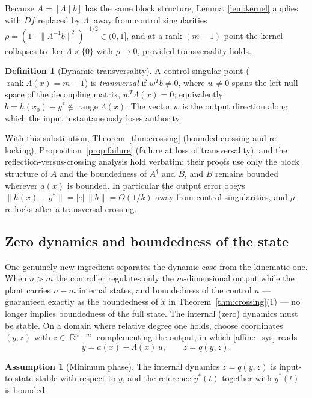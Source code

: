 \documentclass[11pt,american]{article}
\DeclareMathOperator{\R}{\mathbb{R}}
\DeclareMathOperator{\rank}{\operatorname{rank}}
\DeclareMathOperator{\range}{range}
\theoremstyle{definition}
\newtheorem{definition}{Definition}
\newtheorem{assumption}{Assumption}
\theoremstyle{plain}
\theoremstyle{remark}
\begin{document}
Because $A = [\Lambda \mid b]$ has the same block structure, Lemma~\ref{lem:kernel} applies with $D f$ replaced by $\Lambda$: away from control singularities $\rho = (1 + \|\Lambda^{-1} b\|^2)^{-1/2} \in (0,1]$, and at a rank-$(m-1)$ point the kernel collapses to $\ker\Lambda \times \{0\}$ with $\rho \to 0$, provided transversality holds.

\begin{definition}[Dynamic transversality]\label{def:dyntransversal}
A control-singular point ($\rank\Lambda(x) = m-1$) is \emph{transversal} if $w^T b \ne 0$, where $w \ne 0$ spans the left null space of the decoupling matrix, $w^T\Lambda(x) = 0$; equivalently $b = h(x_0) - y^* \notin \range\Lambda(x)$. The vector $w$ is the output direction along which the input instantaneously loses authority.
\end{definition}

With this substitution, Theorem~\ref{thm:crossing} (bounded crossing and re-locking), Proposition~\ref{prop:failure} (failure at loss of transversality), and the reflection-versus-crossing analysis hold verbatim: their proofs use only the block structure of $A$ and the boundedness of $A^\dagger$ and $B$, and $B$ remains bounded wherever $a(x)$ is bounded. In particular the output error obeys $\|h(x) - y^*\| = |e|\,\|b\| = O(1/k)$ away from control singularities, and $\mu$ re-locks after a transversal crossing.

\subsection{Zero dynamics and boundedness of the state}

One genuinely new ingredient separates the dynamic case from the kinematic one. When $n > m$ the controller regulates only the $m$-dimensional output while the plant carries $n-m$ internal states, and boundedness of the control $u$ --- guaranteed exactly as the boundedness of $\dot x$ in Theorem~\ref{thm:crossing}(1) --- no longer implies boundedness of the full state. The internal (zero) dynamics must be stable. On a domain where relative degree one holds, choose coordinates $(y,z)$ with $z \in \R^{n-m}$ complementing the output, in which \eqref{affine_sys} reads
\begin{equation}
\dot y = a(x) + \Lambda(x)\,u, \qquad \dot z = q(y,z).
\end{equation}

\begin{assumption}[Minimum phase]\label{as:minphase}
The internal dynamics $\dot z = q(y,z)$ is input-to-state stable with respect to $y$, and the reference $y^*(t)$ together with $\dot y^*(t)$ is bounded.
\end{assumption}
\end{document}
